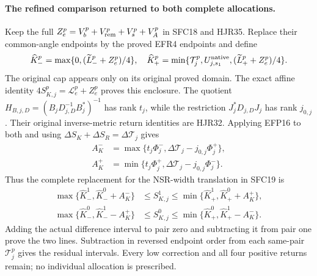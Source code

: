 \documentclass[11pt,a4paper]{article}
\begin{document}
\paragraph{The refined comparison returned to both complete allocations.}
Keep the full $Z_e^p=V_b^p+V_{\rm rem}^p+V_s^p+V_A^p$
in SFC18 and HJR35. Replace their common-angle endpoints by the
proved EFR4 endpoints and define
\[
\widehat K_-^p=\max\{0,(\widetilde L_-^p+Z_e^p)/4\},\quad
\widehat K_+^p=\min\{\mathcal T_j^p,U_{j,s_1}^{\rm native},
                     (\widetilde L_+^p+Z_e^p)/4\}.
\]
The original cap appears only on its original proved domain.
The exact affine identity
$4S_{K,j}^p=\mathcal L_e^p+Z_e^p$
proves this enclosure. The quotient
$H_{B,j,D}=(B_jD_{j,D}^{-1}B_j^*)^{-1}$ has rank $t_j$,
while the restriction $J_j^*D_{j,D}J_j$ has rank $j_{0,j}$.
Their original inverse-metric return identities are HJR32.
Applying EFP16 to both and using
$\Delta S_K+\Delta S_R=\Delta\mathcal T_j$ gives
\[
\begin{aligned}
A_K^-&=\max\{t_j\Phi_j^-,\Delta\mathcal T_j-j_{0,j}\Phi_j^+\},\\
A_K^+&=\min\{t_j\Phi_j^+,\Delta\mathcal T_j-j_{0,j}\Phi_j^-\}.
\end{aligned}\tag{EFR5}
\]
Thus the complete replacement for the NSR-width translation in
SFC19 is
\[
\begin{aligned}
\max\{\widehat K_-^1,\widehat K_-^0+A_K^-\}
 &\le S_{K,j}^1
 \le\min\{\widehat K_+^1,\widehat K_+^0+A_K^+\},\\
\max\{\widehat K_-^0,\widehat K_-^1-A_K^+\}
 &\le S_{K,j}^0
 \le\min\{\widehat K_+^0,\widehat K_+^1-A_K^-\}.
\end{aligned}\tag{EFR6}
\]
Adding the actual difference interval to pair zero and subtracting
it from pair one prove the two lines. Subtraction in reversed
endpoint order from each same-pair $\mathcal T_j^p$ gives the
residual intervals. Every low correction and all four positive
returns remain; no individual allocation is prescribed.











\clearpage
\end{document}
